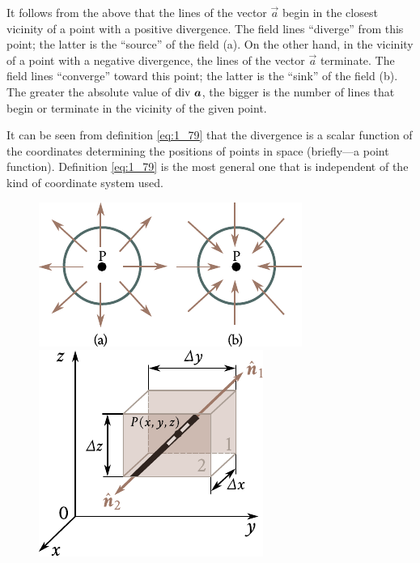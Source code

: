 It follows from the above that the lines of the vector $\vec{a}$ begin in the closest vicinity of a point with a positive divergence. The field lines ``diverge'' from this point; the latter is the ``source'' of the field (a). On the other hand, in the vicinity of a point with a negative divergence, the lines of the vector $\vec{a}$ terminate. The field lines ``converge'' toward this point; the latter is the ``sink'' of the field (b). The greater the absolute value of $\text{div~}\boldsymbol{a}$, the bigger is the number of lines that begin or terminate in the vicinity of the given point.

It can be seen from definition \eqref{eq:1_79} that the divergence is a scalar function of the coordinates determining the positions of points in space (briefly---a point function). Definition \eqref{eq:1_79} is the most general one that is independent of the kind of coordinate system used.

\begin{figure}[t]
	\begin{minipage}[t]{0.5\linewidth}
		\begin{center}
			\includegraphics[scale=1.0]{figures/ch_01/fig_1_24.pdf}
			\caption[]{}
			\label{fig:1_24}
		\end{center}
	\end{minipage}
	\hspace{-0.05cm}
	\begin{minipage}[t]{0.5\linewidth}
		\begin{center}
			\includegraphics[scale=1.0]{figures/ch_01/fig_1_25.pdf}
			\caption[]{}
			\label{fig:1_25}
		\end{center}
	\end{minipage}
\vspace{-0.4cm}
\end{figure}

